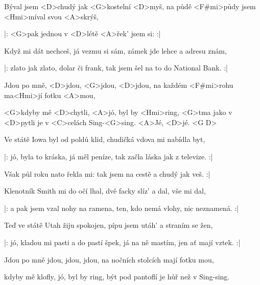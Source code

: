 

\zs
Býval jsem <D>chudý jak <G>kostelní <D>myš,
na půdě <F#mi>půdy jsem <Hmi>míval svou <A>skrýš,

|: <G>pak jednou v <D>létě <A>řek' jsem si:  :|
\ks

\zs
Když mi dát nechceš, já vezmu si sám,
zámek jde lehce a adresu znám,

|: zlato jak zlato, dolar či frank,
tak jsem šel na to do National Bank. :|
\ks

\zr
Jdou po mně, <D>jdou, <G>jdou, <D>jdou,
na každém <F#mi>rohu ma<Hmi>jí fotku <A>mou,

<G>kdyby mě <D>chytli, <A>jó, byl by <Hmi>ring,
<G>tma jako v <D>pytli je v <C>celách Sing-<G>sing. <A>Jé, <D>jé. <G D>
\kr

\zs
Ve státě Iowa byl od poldů klid,
chudičká vdova mi nabídla byt,

|: jó, byla to kráska, já měl peníze,
tak začla láska jak z televize. :|
\ks

\zs
Však půl roku nato řekla mi: 
tak jsem na cestě a chudý jak veš. :|
\ks

\zr \kr

\zs
Klenotník Smith mi do očí lhal,
dvě facky slíz' a dal, vše mi dal,

|: a pak jsem vzal nohy na ramena,
ten, kdo nemá vlohy, nic neznamená. :|
\ks

\zs
Teď ve státě Utah žiju spokojen,
pípu jsem utáh' a straním se žen,

|: jó, kladou mi pasti a do pastí špek,
já na ně mastím, jen ať mají vztek. :|
\ks

\zr
Jdou po mně jdou, jdou, jdou,
na nočních stolcích mají fotku mou,

kdyby mě klofly, jó, byl by ring,
být pod pantoflí je hůř než v Sing-sing.
\kr

\kp
